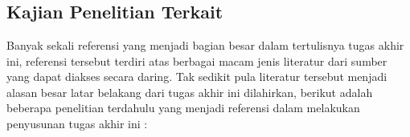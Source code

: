 \chapter{\babDua}

\section{Kajian Penelitian Terkait}
Banyak sekali referensi yang menjadi bagian besar dalam tertulisnya tugas akhir ini, referensi tersebut terdiri atas berbagai macam jenis literatur dari sumber yang dapat diakses secara daring. Tak sedikit pula literatur tersebut menjadi alasan besar latar belakang dari tugas akhir ini dilahirkan, berikut adalah beberapa penelitian terdahulu yang menjadi referensi dalam melakukan penyusunan tugas akhir ini :

